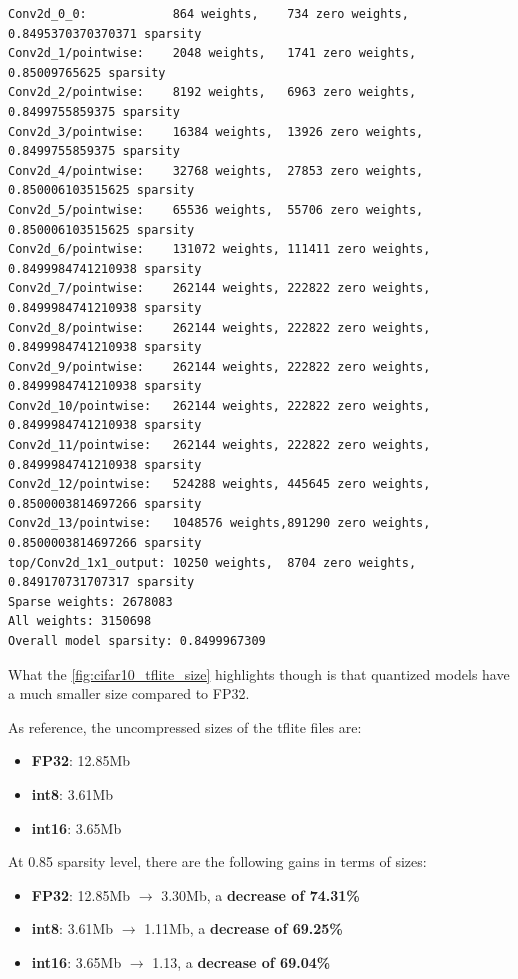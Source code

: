\begin{lstlisting}[label={lst:uniform_weights},
    caption=MobileNet v1 and CIFAR-10: uniform weights distributions]
Conv2d_0_0:            864 weights,    734 zero weights,    0.8495370370370371 sparsity
Conv2d_1/pointwise:    2048 weights,   1741 zero weights,   0.85009765625 sparsity
Conv2d_2/pointwise:    8192 weights,   6963 zero weights,   0.8499755859375 sparsity
Conv2d_3/pointwise:    16384 weights,  13926 zero weights,  0.8499755859375 sparsity
Conv2d_4/pointwise:    32768 weights,  27853 zero weights,  0.850006103515625 sparsity
Conv2d_5/pointwise:    65536 weights,  55706 zero weights,  0.850006103515625 sparsity
Conv2d_6/pointwise:    131072 weights, 111411 zero weights, 0.8499984741210938 sparsity
Conv2d_7/pointwise:    262144 weights, 222822 zero weights, 0.8499984741210938 sparsity
Conv2d_8/pointwise:    262144 weights, 222822 zero weights, 0.8499984741210938 sparsity
Conv2d_9/pointwise:    262144 weights, 222822 zero weights, 0.8499984741210938 sparsity
Conv2d_10/pointwise:   262144 weights, 222822 zero weights, 0.8499984741210938 sparsity
Conv2d_11/pointwise:   262144 weights, 222822 zero weights, 0.8499984741210938 sparsity
Conv2d_12/pointwise:   524288 weights, 445645 zero weights, 0.8500003814697266 sparsity
Conv2d_13/pointwise:   1048576 weights,891290 zero weights, 0.8500003814697266 sparsity
top/Conv2d_1x1_output: 10250 weights,  8704 zero weights,   0.849170731707317 sparsity
Sparse weights: 2678083
All weights: 3150698
Overall model sparsity: 0.8499967309
\end{lstlisting}

What the \autoref{fig:cifar10_tflite_size} highlights though is that quantized
models have a much smaller size compared to FP32.

As reference, the uncompressed sizes of the tflite files are:
\begin{itemize}
    \item \textbf{FP32}: 12.85Mb
    \item \textbf{int8}: 3.61Mb
    \item \textbf{int16}: 3.65Mb
\end{itemize}

At 0.85 sparsity level, there are the following gains in terms of sizes:
\begin{itemize}
    \item \textbf{FP32}: 12.85Mb $\rightarrow$ 3.30Mb, a \textbf{decrease of 74.31\%}
    \item \textbf{int8}: 3.61Mb $\rightarrow$ 1.11Mb, a \textbf{decrease of 69.25\%}
    \item \textbf{int16}: 3.65Mb $\rightarrow$ 1.13, a \textbf{decrease of 69.04\%}
\end{itemize}

